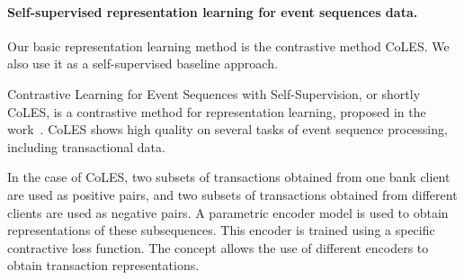 \paragraph{Self-supervised representation learning for event sequences data.}
Our basic representation learning method is the contrastive method CoLES. We also use it as a self-supervised baseline approach.

Contrastive Learning for Event Sequences with Self-Supervision, or shortly CoLES, is a contrastive method for representation learning, proposed in the work~\cite{babaev2022coles}.
CoLES shows high quality on several tasks of event sequence processing, including transactional data. 

In the case of CoLES, two subsets of transactions obtained from one bank client are used as positive pairs, and two subsets of transactions obtained from different clients are used as negative pairs.
A parametric encoder model is used to obtain representations of these subsequences. This encoder is trained using a specific contractive loss function. 
The concept allows the use of different encoders to obtain transaction representations. 







